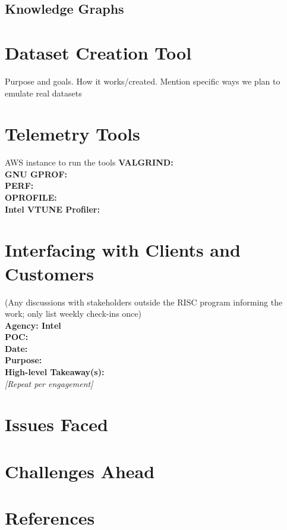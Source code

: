 \documentclass[letterpaper, 10pt]{article}
\begin{document}
\begin{multicols}{2}
        \subsection{Knowledge Graphs}
            \lipsum[7]
    \section{Dataset Creation Tool}
        Purpose and goals. How it works/created. Mention specific ways we plan to emulate real datasets \\
    \section{Telemetry Tools}
        AWS instance to run the tools
        \textbf{VALGRIND:} \\  
        \textbf{GNU GPROF:}  \\
        \textbf{PERF:}  \\
        \textbf{OPROFILE:} \\
        \textbf{Intel VTUNE Profiler:} \\
       
    \section{Interfacing with Clients and Customers}
        (Any discussions with stakeholders outside the RISC  program informing the work; only list weekly check-ins  once) \\
        \textbf{Agency: Intel} \\  
        \textbf{POC:}  \\
        \textbf{Date:} \\
        \textbf{Purpose:} \\
        \textbf{High-level Takeaway(s):} \\ 
        \textit{[Repeat per engagement]} 

    \section{Issues Faced}
        \lipsum[8]
    \section{Challenges Ahead}
        \lipsum[9]
    \section{References}
        \printbibliography[heading=none]


\end{multicols}
\end{document}
